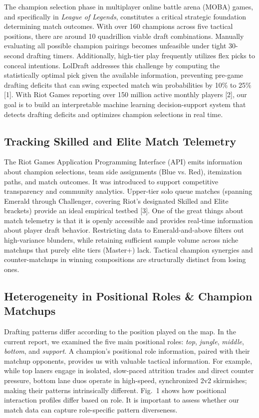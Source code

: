 \documentclass[11pt,letterpaper]{article}
\begin{document}
The champion selection phase in multiplayer online battle arena (MOBA) games, and specifically in \textit{League of Legends}, constitutes a critical strategic foundation determining match outcomes. With over 160 champions across five tactical positions, there are around 10 quadrillion viable draft combinations. Manually evaluating all possible champion pairings becomes unfeasible under tight 30-second drafting timers. Additionally, high-tier play frequently utilizes flex picks to conceal intentions. LolDraft addresses this challenge by computing the statistically optimal pick given the available information, preventing pre-game drafting deficits that can swing expected match win probabilities by 10\% to 25\% [1]. With Riot Games reporting over 150 million active monthly players [2], our goal is to build an interpretable machine learning decision-support system that detects drafting deficits and optimizes champion selections in real time.

\subsection{Tracking Skilled and Elite Match Telemetry}

The Riot Games Application Programming Interface (API) emits information about champion selections, team side assignments (Blue vs. Red), itemization paths, and match outcomes. It was introduced to support competitive transparency and community analytics. Upper-tier solo queue matches (spanning Emerald through Challenger, covering Riot's designated Skilled and Elite brackets) provide an ideal empirical testbed [3]. One of the great things about match telemetry is that it is openly accessible and provides real-time information about player draft behavior. Restricting data to Emerald-and-above filters out high-variance blunders, while retaining sufficient sample volume across niche matchups that purely elite tiers (Master+) lack. Tactical champion synergies and counter-matchups in winning compositions are structurally distinct from losing ones.

\subsection{Heterogeneity in Positional Roles \& Champion Matchups}

Drafting patterns differ according to the position played on the map. In the current report, we examined the five main positional roles: \textit{top}, \textit{jungle}, \textit{middle}, \textit{bottom}, and \textit{support}. A champion's positional role information, paired with their matchup opponents, provides us with valuable tactical information. For example, while top laners engage in isolated, slow-paced attrition trades and direct counter pressure, bottom lane duos operate in high-speed, synchronized 2v2 skirmishes; making their patterns intrinsically different. Fig.~1 shows how positional interaction profiles differ based on role. It is important to assess whether our match data can capture role-specific pattern diverseness.
\end{document}
